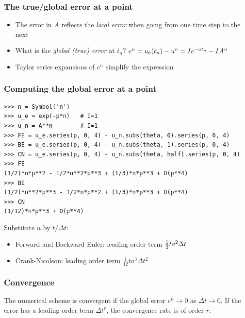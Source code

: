 \documentclass{beamer}
\begin{document}
\begin{frame}
\frametitle{The true/global error at a point}

\label{decay:analysis:gobal:error}

\begin{itemize}
 \item The error in $A$ reflects the \emph{local error} when going from one
   time step to the next

 \item What is the \emph{global (true) error} at $t_n$?
   $e^n = \uex(t_n) - u^n = Ie^{-at_n} - IA^n$

 \item Taylor series expansions of $e^n$ simplify the expression
\end{itemize}

\noindent
\end{frame}

\begin{frame}
\frametitle{Computing the global error at a point}

\begin{verbatim}
>>> n = Symbol('n')
>>> u_e = exp(-p*n)   # I=1
>>> u_n = A**n        # I=1
>>> FE = u_e.series(p, 0, 4) - u_n.subs(theta, 0).series(p, 0, 4)
>>> BE = u_e.series(p, 0, 4) - u_n.subs(theta, 1).series(p, 0, 4)
>>> CN = u_e.series(p, 0, 4) - u_n.subs(theta, half).series(p, 0, 4)
>>> FE
(1/2)*n*p**2 - 1/2*n**2*p**3 + (1/3)*n*p**3 + O(p**4)
>>> BE
(1/2)*n**2*p**3 - 1/2*n*p**2 + (1/3)*n*p**3 + O(p**4)
>>> CN
(1/12)*n*p**3 + O(p**4)
\end{verbatim}
Substitute $n$ by $t/\Delta t$:

\begin{itemize}
 \item Forward and Backward Euler: leading order term $\half ta^2\Delta t$

 \item Crank-Nicolson: leading order term $\frac{1}{12}ta^3\Delta t^2$
\end{itemize}

\noindent
\end{frame}

\begin{frame}
\frametitle{Convergence}

The numerical scheme is convergent if the global error
$e^n\rightarrow 0$ as $\Delta t\rightarrow 0$.
If the error has a leading order term $\Delta t^r$, the
convergence rate is of order $r$.
\end{frame}
\end{document}
